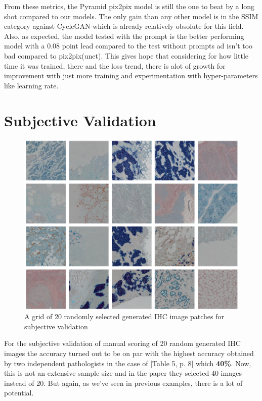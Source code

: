 From these metrics, the Pyramid pix2pix model is still the one to beat by a long shot compared to our models. The only gain than any other model is in the SSIM category against CycleGAN which is already relatively obsolute for this field. Also, as expected, the model tested with the prompt is the better performing model with a 0.08 point lead compared to the test without prompts ad isn't too bad compared to pix2pix(unet). This gives hope that considering for how little time it was trained, there and the loss trend, there is alot of growth for improvement with just more training and experimentation with hyper-parameters like learning rate.

\section{Subjective Validation}

\begin{figure}[h]
    \centering
    \includegraphics[width=1\linewidth]{5_Results/figures/subjective-eval-samples.png}
    \caption{A grid of 20 randomly selected generated IHC image patches for subjective validation}
    \label{fig:sub-eval-grid}
\end{figure}

For the subjective validation of manual scoring of 20 random generated IHC images the accuracy turned out to be on par with the highest accuracy obtained by two independent pathologists in the case of \textcite{Liu2022BCI:Pix2pix}[Table 5, p. 8] which \textbf{40\%}. Now, this is not an extensive sample size and in the paper they selected 40 images instead of 20. But again, as we've seen in previous examples, there is a lot of potential.

